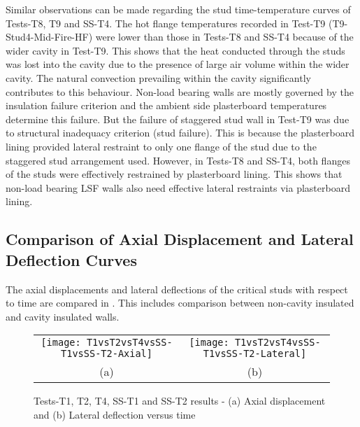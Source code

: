 Similar observations can be made regarding the stud time-temperature curves of Tests-T8, T9 and SS-T4. The hot flange temperatures recorded in Test-T9 (T9-Stud4-Mid-Fire-HF) were lower than those in Tests-T8 and SS-T4 because of the wider cavity in Test-T9. This shows that the heat conducted through the studs was lost into the cavity due to the presence of large air volume within the wider cavity. The natural convection prevailing within the cavity significantly contributes to this behaviour. Non-load bearing walls are mostly governed by the insulation failure criterion and the ambient side plasterboard temperatures determine this failure. But the failure of staggered stud wall in Test-T9 was due to structural inadequacy criterion (stud failure). This is because the plasterboard lining provided lateral restraint to only one flange of the stud due to the staggered stud arrangement used. However, in Tests-T8 and SS-T4, both flanges of the studs were effectively restrained by plasterboard lining. This shows that non-load bearing LSF walls also need effective lateral restraints via plasterboard lining.

\subsection{Comparison of Axial Displacement and Lateral Deflection Curves}

The axial displacements and lateral deflections of the critical studs with respect to time are compared in  . This includes comparison between non-cavity insulated and cavity insulated walls. 
\begin{figure}[!htbp]
	\centering
		\begin{tabular}{cc}
			\texttt{[image: T1vsT2vsT4vsSS-T1vsSS-T2-Axial]} & \texttt{[image: T1vsT2vsT4vsSS-T1vsSS-T2-Lateral]} \\ 
			(a) & (b)  \\ 
		\end{tabular} 
		\caption{Tests-T1, T2, T4, SS-T1 and SS-T2 results - (a) Axial displacement and (b) Lateral deflection versus time}
		\label{fig:T1vsT2vsT4vsSS-T1vsSS-T2-Displacement}
\end{figure}


